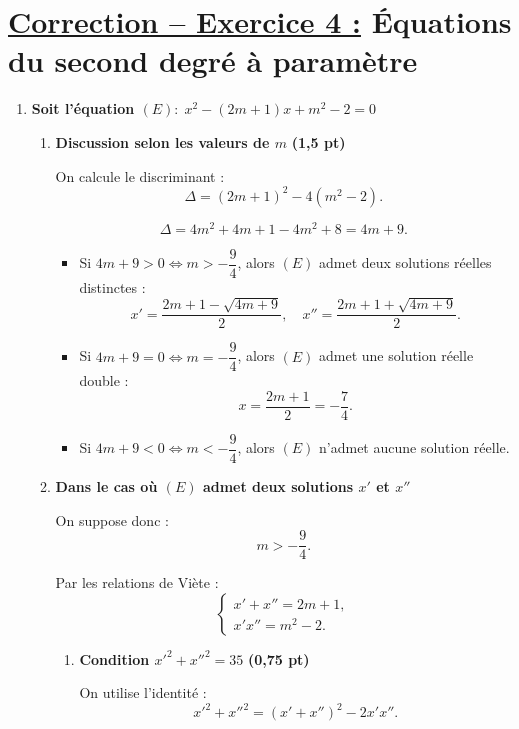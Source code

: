 \documentclass[12pt,a4paper]{article}
\begin{document}
\section*{\underline{Correction – Exercice 4 :} Équations du second degré à paramètre}

\begin{enumerate}

\item \textbf{Soit l’équation $(E):\; x^2-(2m+1)x+m^2-2=0$}

\begin{enumerate}

\item \textbf{Discussion selon les valeurs de $m$} \hfill \textbf{(1,5 pt)}

On calcule le discriminant :
\[
\Delta=(2m+1)^2-4(m^2-2).
\]

\[
\Delta=4m^2+4m+1-4m^2+8=4m+9.
\]

\begin{itemize}
    \item Si $4m+9>0 \iff m>-\dfrac{9}{4}$, alors $(E)$ admet deux solutions réelles distinctes :
    \[
    x'=\frac{2m+1-\sqrt{4m+9}}{2},
    \quad
    x''=\frac{2m+1+\sqrt{4m+9}}{2}.
    \]

    \item Si $4m+9=0 \iff m=-\dfrac{9}{4}$, alors $(E)$ admet une solution réelle double :
    \[
    x=\frac{2m+1}{2}=-\frac{7}{4}.
    \]

    \item Si $4m+9<0 \iff m<-\dfrac{9}{4}$, alors $(E)$ n’admet aucune solution réelle.
\end{itemize}

\item \textbf{Dans le cas où $(E)$ admet deux solutions $x'$ et $x''$}

On suppose donc :
\[
m>-\frac{9}{4}.
\]

Par les relations de Viète :
\[
\begin{cases}
x'+x''=2m+1,\\
x'x''=m^2-2.
\end{cases}
\]

\begin{enumerate}

\item \textbf{Condition $x'^2+x''^2=35$} \hfill \textbf{(0,75 pt)}

On utilise l’identité :
\[
x'^2+x''^2=(x'+x'')^2-2x'x''.
\]


\end{enumerate}
\end{enumerate}
\end{enumerate}
\end{document}
